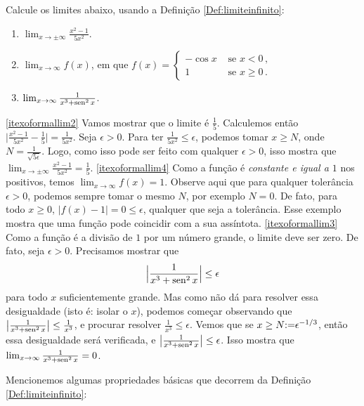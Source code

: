 \begin{exo}\label{exo_LIM_fasssiu} Calcule os limites abaixo, 
usando a Definição \ref{Def:limiteinfinito}:
\begin{enumerate}
\item\label{itexoformallim2} $\lim_{x\to
\pm\infty}\frac{x^2-1}{5x^2}$.
\item\label{itexoformallim4} $\lim_{x\to\infty}f(x)$, em que 
$f(x)=
\begin{cases}
-\cos x&\text{ se }x< 0\,,\\
1&\text{ se }x\geq 0\,.
\end{cases}$
\item\label{itexoformallim3} $\lim_{x\to \infty}\frac{1}{x^3+\operatorname{sen}^2
x}$.
\end{enumerate}
\begin{sol}
\eqref{itexoformallim2}
Vamos mostrar que o limite é $\tfrac15$.
Calculemos então
$\bigl|\frac{x^2-1}{5x^2}-\tfrac15\bigr|=\frac{1}{5x^2}$.
Seja $\epsilon>0$. Para ter $\tfrac{1}{5x^2}\leq \epsilon$, podemos tomar 
$x\geq N$, onde $N=\frac{1}{\sqrt{5\epsilon}}$.
Logo, como isso pode ser feito com qualquer $\epsilon>0$, isso mostra que
$\lim_{x\to \pm\infty}\frac{x^2-1}{5x^2}=\tfrac15$.
\eqref{itexoformallim4}
Como a função é \emph{constante e igual a $1$} nos positivos, temos
$\lim_{x\to\infty}f(x)=1$. Observe aqui que para qualquer tolerância $\epsilon>0$,
podemos sempre tomar o mesmo $N$, por exemplo $N=0$. De fato, para todo $x\geq 0$,
$|f(x)-1|=0\leq \epsilon$, qualquer que seja a tolerância. 
Esse exemplo mostra que uma função pode coincidir com a sua assíntota.
\eqref{itexoformallim3} 
Como a função é a divisão de $1$ por um número grande, o limite deve ser zero.
De fato, seja $\epsilon>0$. Precisamos mostrar que 
\[ \Bigl|\frac{1}{x^3+\operatorname{sen}^2 x}\Bigr|\leq \epsilon
\]
para todo $x$ suficientemente grande. Mas como não dá para resolver essa desigualdade
(isto é: isolar o $x$), podemos começar observando que
$\bigl|\frac{1}{x^3+\operatorname{sen}^2 x}\bigr|\leq	\frac{1}{x^3}$, e procurar
resolver $\frac{1}{x^3}\leq \epsilon$.
Vemos que se $x\geq N{:=} \epsilon^{-1/3}$, então essa desigualdade será
verificada, e $\bigl|\frac{1}{x^3+\operatorname{sen}^2 x}\bigr|\leq \epsilon$.
Isso mostra que $\lim_{x\to \infty}\frac{1}{x^3+\operatorname{sen}^2 x}=0$.
\end{sol}
\end{exo}


Mencionemos algumas propriedades básicas que decorrem da Definição
\ref{Def:limiteinfinito}:

